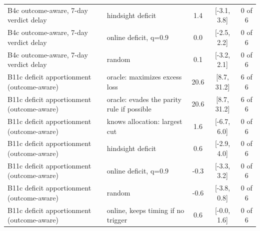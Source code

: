 \begin{table}[!t]
{\begin{tabular}{llccc}
B4c outcome-aware, 7-day verdict delay & hindsight deficit & 1.4 & [-3.1, 3.8] & 0 of 6 \\
B4c outcome-aware, 7-day verdict delay & online deficit, q=0.9 & 0.0 & [-2.5, 2.2] & 0 of 6 \\
B4c outcome-aware, 7-day verdict delay & random & 0.1 & [-3.2, 2.1] & 0 of 6 \\
\midrule
B11c deficit apportionment (outcome-aware) & oracle: maximizes excess loss & 20.6 & [8.7, 31.2] & 6 of 6 \\
B11c deficit apportionment (outcome-aware) & oracle: evades the parity rule if possible & 20.6 & [8.7, 31.2] & 6 of 6 \\
B11c deficit apportionment (outcome-aware) & knows allocation: largest cut & 1.6 & [-6.7, 6.0] & 0 of 6 \\
B11c deficit apportionment (outcome-aware) & hindsight deficit & 0.6 & [-2.9, 4.0] & 0 of 6 \\
B11c deficit apportionment (outcome-aware) & online deficit, q=0.9 & -0.3 & [-3.3, 3.2] & 0 of 6 \\
B11c deficit apportionment (outcome-aware) & random & -0.6 & [-3.8, 0.8] & 0 of 6 \\
B11c deficit apportionment (outcome-aware) & online, keeps timing if no trigger & 0.6 & [-0.0, 1.6] & 0 of 6 \\
\bottomrule
\end{tabular}}
\end{table}

